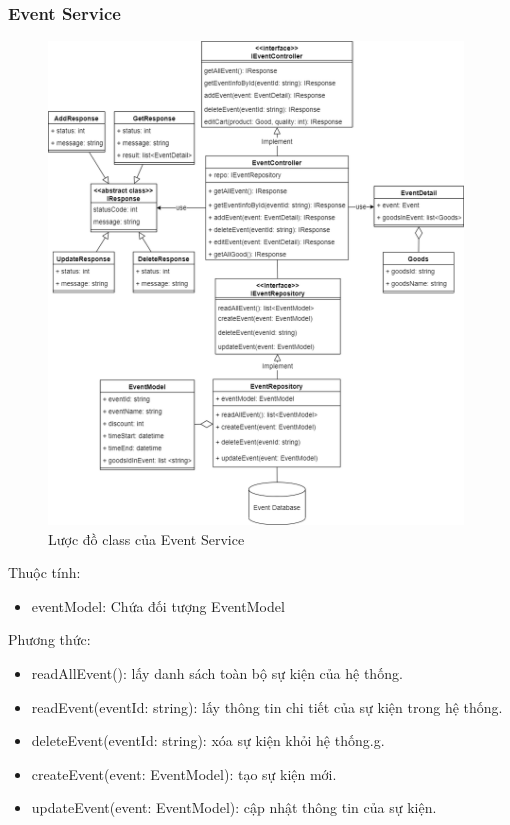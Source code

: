 \newpage


\subsubsection{Event Service}
\begin{figure}[!htp]
	\centering
	\includegraphics[width=11cm]{img/Architecture/service/EventService.png}
	\newline
	\caption{Lược đồ class của Event Service}
\end{figure}

Thuộc tính:
\begin{itemize}
	\item eventModel: Chứa đối tượng EventModel
\end{itemize}
Phương thức:
\begin{itemize}
	\item readAllEvent(): lấy danh sách toàn bộ sự kiện của hệ thống.
	\item readEvent(eventId: string): lấy thông tin chi tiết của sự kiện trong hệ thống.
	\item deleteEvent(eventId: string): xóa sự kiện khỏi hệ thống.g.
	\item createEvent(event: EventModel): tạo sự kiện mới.
	\item updateEvent(event: EventModel): cập nhật thông tin của sự kiện.
\end{itemize}


